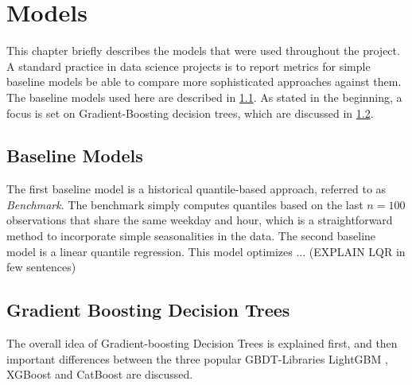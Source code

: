 
\section{Models}
\label{ch:Models}

This chapter briefly describes the models that were used throughout the project. A standard practice in data science projects is to report metrics for simple baseline models be able to compare more sophisticated approaches against them. The baseline models used here are described in \cref{sec:Models:Baselines}. As stated in the beginning, a focus is set on Gradient-Boosting decision trees, which are discussed in \cref{sec:Models:GBDT}.

\subsection{Baseline Models}
\label{sec:Models:Baselines}

The first baseline model is a historical quantile-based approach, referred to as \textit{Benchmark}. The benchmark simply computes quantiles based on the last $n = 100$ observations that share the same weekday and hour, which is a straightforward method to incorporate simple seasonalities in the data. The second baseline model is a linear quantile regression. This model optimizes ... (EXPLAIN LQR in few sentences)

\subsection{Gradient Boosting Decision Trees}
\label{sec:Models:GBDT}

The overall idea of Gradient-boosting Decision Trees is explained first, and then important differences between the three popular GBDT-Libraries LightGBM \parencite{ke_lightgbm_2017}, XGBoost \parencite{chen_xgboost_2016}  and CatBoost \parencite{prokhorenkova_catboost_2017} are discussed.


